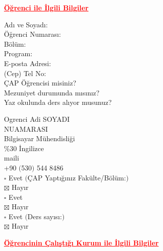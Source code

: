\documentclass[12pt]{article}
\newcommand{\isim}{Ogrenci Adi SOYADI}
\newcommand{\id}{NUAMARASI}
\newcommand{\mail}{maili}
\begin{document}
{\centering
  \textcolor{red}{\bfseries \ul{ Öğrenci ile İlgili Bilgiler}}
  \\[1\baselineskip]
  \par}
\begin{minipage}[t]{.3\textwidth}
  \vspace{0pt}
  \begin{flushright}
  Adı ve Soyadı: \\
  Öğrenci Numarası: \\
  Bölüm: \\
  Program: \\ 
  E-posta Adresi: \\
  (Cep) Tel No: \\
  ÇAP Öğrencisi misiniz? \\[2\baselineskip]
  Mezuniyet durumunda mısınız? \\[1\baselineskip]
  Yaz okulunda ders alıyor musunuz? \\
  \end{flushright}
\end{minipage}%
\hspace{0.5cm}
\begin{minipage}[t]{.7\textwidth}
  \vspace{0pt}
  \isim\\
  \id\\
  Bilgisayar Mühendisliği \\
  \%30 İngilizce \\
  \mail\\
  +90 $($530$)$ 544 8486 \\
  $\square$ Evet $($ÇAP Yaptığınız Fakülte/Bölüm:\underline{\hspace{3cm}}$)$ \\
  $\boxtimes$ Hayır \\[1\baselineskip]
  $\square$ Evet \\
  $\boxtimes$ Hayır \\[1\baselineskip]
  $\square$ Evet $($Ders sayısı:\textunderscore$)$ \\
  $\boxtimes$ Hayır \\
\end{minipage}

{\centering
  \textcolor{red}{\bfseries \ul{Öğrencinin Çalışt{\i}\u{g}ı Kurum ile İlgili Bilgiler}}
  \\[1\baselineskip]
  \par}
\end{document}
